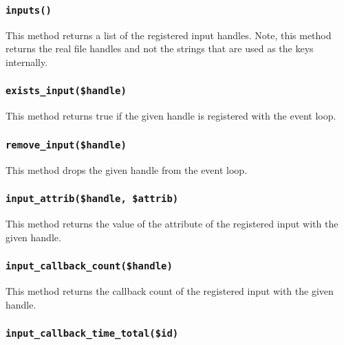 \documentclass[12pt,a4paper]{article}
\begin{document}
\subsubsection*{\texttt{inputs()}\label{xPL::Listener_inputs_}}


This method returns a list of the registered input handles.  Note,
this method returns the real file handles and not the strings that
are used as the keys internally.

\subsubsection*{\texttt{exists\_input(\$handle)}\label{xPL::Listener_exists_input_handle_}}


This method returns true if the given handle is registered with the
event loop.

\subsubsection*{\texttt{remove\_input(\$handle)}\label{xPL::Listener_remove_input_handle_}}


This method drops the given handle from the event loop.

\subsubsection*{\texttt{input\_attrib(\$handle, \$attrib)}\label{xPL::Listener_input_attrib_handle_attrib_}}


This method returns the value of the attribute of the registered input with
the given handle.

\subsubsection*{\texttt{input\_callback\_count(\$handle)}\label{xPL::Listener_input_callback_count_handle_}}


This method returns the callback count of the registered input with
the given handle.

\subsubsection*{\texttt{input\_callback\_time\_total(\$id)}\label{xPL::Listener_input_callback_time_total_id_}}
\end{document}
